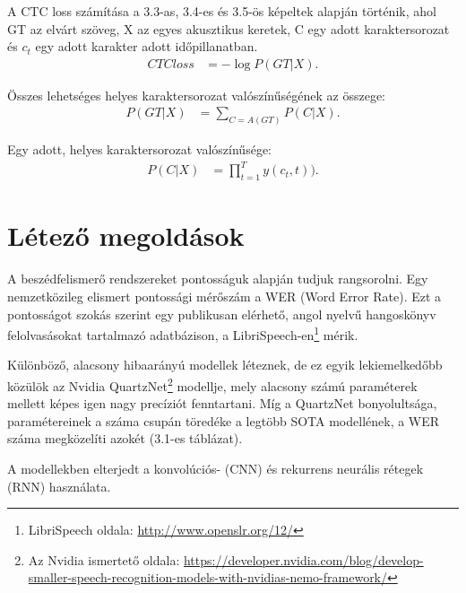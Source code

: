 A CTC loss számítása a 3.3-as, 3.4-es és 3.5-ös képeltek alapján történik, ahol GT az elvárt szöveg, X az egyes akusztikus keretek, C egy adott karaktersorozat és $c_t$ egy adott karakter adott időpillanatban.
\begin{align}
CTC loss&=-\log{P(GT | X)}.
\end{align}

Összes lehetséges helyes karaktersorozat valószínűségének az összege:
\begin{align}
P(GT | X)&=\sum_{C=A(GT)} P(C | X).
\end{align}

Egy adott, helyes karaktersorozat valószínűsége:
\begin{align}
P(C | X)&=\prod_{t=1}^{T} y(c_t, t)).
\end{align}

\section{Létező megoldások}

A beszédfelismerő rendszereket pontosságuk alapján tudjuk rangsorolni. Egy nemzetközileg elismert pontossági mérőszám a WER (Word Error Rate). Ezt a pontosságot szokás szerint egy publikusan elérhető, angol nyelvű hangoskönyv felolvasásokat tartalmazó adatbázison, a LibriSpeech-en\footnote{LibriSpeech oldala: \url{http://www.openslr.org/12/}} mérik.

Különböző, alacsony hibaarányú modellek léteznek, de ez egyik lekiemelkedőbb közülök az Nvidia QuartzNet\footnote{Az Nvidia ismertető oldala: \url{https://developer.nvidia.com/blog/develop-smaller-speech-recognition-models-with-nvidias-nemo-framework/}} modellje, mely alacsony számú paraméterek mellett képes igen nagy precíziót fenntartani. Míg a QuartzNet bonyolultsága, paramétereinek a száma csupán töredéke a legtöbb SOTA modellének, a WER száma megközelíti azokét (3.1-es táblázat).

A modellekben elterjedt a konvolúciós- (CNN) és rekurrens neurális rétegek  (RNN) használata.

